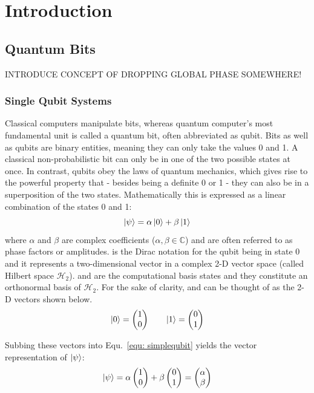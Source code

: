 \chapter{Introduction}\label{sec:introduction}

\section{Quantum Bits}
\label{subsec:qubits}

INTRODUCE CONCEPT OF DROPPING GLOBAL PHASE SOMEWHERE!

\subsection{Single Qubit Systems}
\label{subsubsec:qubits}
Classical computers manipulate bits, whereas quantum computer's most fundamental unit is called a quantum bit, often abbreviated as qubit. Bits as well as qubits are binary entities, meaning they can only take the values 0 and 1. A classical non-probabilistic bit can only be in one of the two possible states at once. In contrast, qubits obey the laws of quantum mechanics, which gives rise to the powerful property that - besides being a definite 0 or 1 - they can also be in a superposition of the two states. Mathematically this is expressed as a linear combination of the states 0 and 1:
\begin{equation}
\label{equ: simplequbit}
\ket{\psi} = \alpha \ket{0} + \beta \ket{1}
\end{equation}
where $\alpha$ and $\beta$ are complex coefficients ($\alpha, \beta \in \mathbb{C}$) and are often referred to as phase factors or amplitudes. \0 is the Dirac notation for the qubit being in state 0 and it represents a two-dimensional vector in a complex 2-D vector space (called Hilbert space $\mathcal{H}_{2}$). \0 and \1 are the computational basis states and they constitute an orthonormal basis of $\mathcal{H}_{2}$. For the sake of clarity, \0 and \1 can be thought of as the 2-D vectors shown below.
\begin{equation}
\label{equ: 0and1kets}
\ket{0} =  \begin{pmatrix}1\\0\end{pmatrix} \quad \quad \ket{1} = \begin{pmatrix}0\\1\end{pmatrix}
\end{equation}

Subbing these vectors into Equ.~\ref{equ: simplequbit} yields the vector representation of $\ket{\psi}$:
\begin{equation}
\label{equ: simplequbitvector}
\ket{\psi} = \alpha \begin{pmatrix}1\\0\end{pmatrix} + \beta \begin{pmatrix}0\\1\end{pmatrix} = \begin{pmatrix}\alpha\\\beta\end{pmatrix}
\end{equation}

